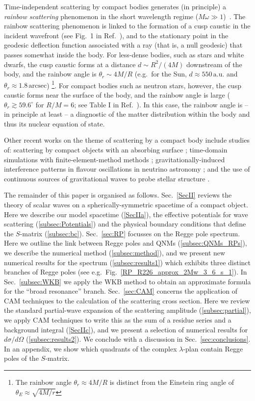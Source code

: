 \documentclass[aps,prd,longbibliography,reprint,twocolumn,amsmath,amssymb,amsfonts,showpacs,footnote,superscriptaddress]{revtex4-1}%
\begin{document}
Time-independent scattering by compact bodies generates (in principle) a \emph{rainbow scattering} phenomenon in the short wavelength regime ($M \omega \gg 1$)~\cite{Dolan:2017rtj, Stratton:2019deq}. The rainbow scattering phenomenon is linked to the formation of a cusp caustic in the incident wavefront (see Fig.~1 in Ref.~\cite{Stratton:2019deq}), and to the stationary point in the geodesic deflection function associated with a ray (that is, a null geodesic) that passes somewhat inside the body. For less-dense bodies, such as stars and white dwarfs, the cusp caustic forms at a distance $d \sim R^2 / (4M)$ downstream of the body, and the rainbow angle is $\theta_r \sim 4M/R$ (e.g.~for the Sun, $d \approx 550 \, \text{a.u.}$ and $\theta_r \approx 1.8 \, \text{arcsec}$) \footnote{The rainbow angle $\theta_r \approx 4M/R$ is distinct from the Einstein ring angle of $\theta_E \approx \sqrt{4M/r}$}. For compact bodies such as neutron stars, however, the cusp caustic forms near the surface of the body, and the rainbow angle is large ($\theta_r \gtrsim 59.6^\circ$ for $R/M = 6$; see Table I in Ref.~\cite{Stratton:2019deq}). In this case, the rainbow angle is -- in principle at least -- a diagnostic of the matter distribution within the body and thus its nuclear equation of state.

Other recent works on the theme of scattering by a compact body include studies of: scattering by compact objects with an absorbing surface \cite{Nambu:2019sqn}; time-domain simulations with finite-element-method methods \cite{He:2019orl}; gravitationally-induced interference patterns in flavour oscillations in neutrino astronomy \cite{Alexandre:2018crg}; and the use of continuous sources of gravitational waves to probe stellar structure \cite{Marchant:2019swq}.

The remainder of this paper is organised as follows. Sec.~\ref{SecII} reviews the theory of scalar waves on a spherically-symmetric spacetime of a compact object. Here we describe our model spacetime (\ref{SecIIa}), the effective potentials for wave scattering (\ref{subsec:Potentials}) and the physical boundary conditions that define the $S$-matrix (\ref{subsec:bc}). Sec.~\ref{sec:RP} focusses on the Regge pole spectrum. Here we outline the link between Regge poles and QNMs (\ref{subsec:QNMs_RPs}), we describe the numerical method (\ref{subsec:method}), and we present new numerical results for the spectrum (\ref{subsec:results1}) which exhibits three distinct branches of Regge poles (see e.g.~Fig.~\ref{RP_R226_approx_2Mw_3_6_s_1}). In Sec.~\ref{subsec:WKB} we apply the WKB method to obtain an approximate formula for the ``broad resonance'' branch. Sec.~\ref{sec:CAM} concerns the application of CAM techniques to the calculation of the scattering cross section. Here we review the standard partial-wave expansion of the scattering amplitude (\ref{subsec:partial}), we apply CAM techniques to write this as the sum of a residue series and a background integral (\ref{SecIIc}), and we present a selection of numerical results for $d\sigma/d\Omega$ (\ref{subsec:results2}). We conclude with a discussion in Sec.~\ref{sec:conclusions}. In an appendix, we show which quadrants of the complex $\lambda$-plan contain Regge poles of the $S$-matrix.
\end{document}
